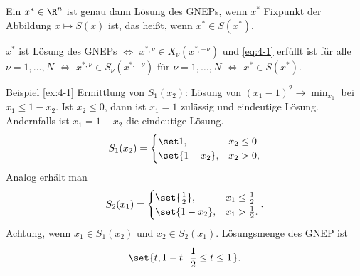 \begin{satz}\label{thm:4-1} 
 Ein $x^{*} \in \R^{n}$ ist genau dann Lösung des GNEPs, wenn $x^{*}$ Fixpunkt der Abbildung $x \mapsto S(x)$ ist, das heißt, wenn $x^{*} \in S(x^{*})$. 
\end{satz}
\begin{beweis}
   $x^{*}$ ist Lösung des GNEPs $\Leftrightarrow$ $x^{*, \nu} \in X_{\nu}(x^{*, -\nu})$ und \eqref{eq:4-1} erfüllt ist für alle $\nu = 1, \dots, N$ $\Leftrightarrow$ $x^{*, \nu} \in S_{\nu} (x^{*, - \nu})$ für $\nu = 1, \dots, N$ $\Leftrightarrow$ $x^{*} \in S(x^{*})$. 
\end{beweis}
\begin{fortsetzung} Beispiel \ref{ex:4-1}
  Ermittlung von $S_{1}(x_{2})$: Lösung von $(x_{1} - 1)^{2} \to \min_{x_{1}}$ bei $x_{1} \leq 1 - x_{2}$. Ist $x_{2} \leq 0$, dann ist $x_{1} = 1$ zulässig und eindeutige Lösung. Andernfalls ist $x_{1} =  1 - x_{2}$ die eindeutige Lösung.
  \begin{align*}
     S_{1}(x_{2})=
     \begin{cases}
       \set 1, & x_{2} \leq 0\\
       \set{1 - x_{2}}, & x_{2} > 0, 
     \end{cases}
  \end{align*}
Analog erhält man 
  \begin{align*}
     S_{2}(x_{1})=
     \begin{cases}
       \set {\frac 1 2}, & x_{1} \leq \frac 1 2\\
       \set{1 - x_{2}}, & x_{1} > \frac 1 2. 
     \end{cases}. 
  \end{align*}
Achtung, wenn $x_{1} \in S_{1}(x_{2})$ und $x_{2} \in S_{2}(x_{1})$. Lösungsmenge des GNEP ist
\begin{align*}
  \set{t, 1-t \left|\, \frac 1 2 \leq t \leq 1\right.}.
\end{align*}
\end{fortsetzung}
